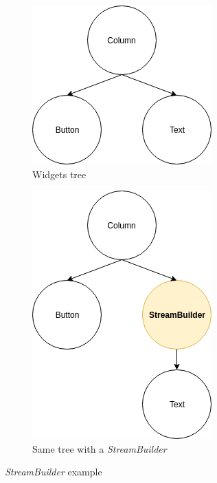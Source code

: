 \begin{figure}[H]
  \centering
  \begin{subfigure}{.5\textwidth}
    \centering
    \includegraphics[width=.8\linewidth]{content/imgs/ex1.png}
    \caption{Widgets tree}
    \label{fig:stream_ex1}
  \end{subfigure}%
  \begin{subfigure}{.5\textwidth}
    \centering
    \includegraphics[width=.8\linewidth]{content/imgs/ex2.png}
    \caption{Same tree with a \textit{StreamBuilder}}
  \end{subfigure}
  \caption{\textit{StreamBuilder} example}
\end{figure}

